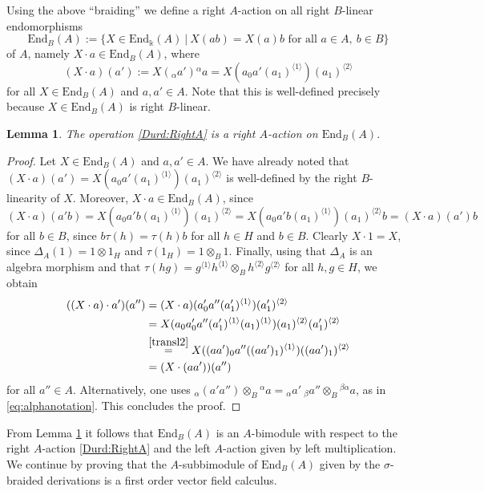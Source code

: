 \documentclass{article}
\newtheorem{lemma}[thm]{Lemma}
\theoremstyle{definition}
\begin{document}
	Using the above ``braiding'' we define a right $A$-action on all right $B$-linear endomorphisms 
	$$
	\mathrm{End}_B(A):=\{X\in\mathrm{End}_\Bbbk(A)~|~X(ab)=X(a)b\text{ for all }a\in A,~b\in B\}
	$$
	of $A$, namely $X\cdot a\in\mathrm{End}_B(A)$, where
	\begin{equation}\label{Durd:RightA}
		(X\cdot a)(a'):=X({}_\alpha a'){}^\alpha a
		=X(a_0a'(a_1)^{\langle 1\rangle})(a_1)^{\langle 2\rangle}
	\end{equation}
	for all $X\in\mathrm{End}_B(A)$ and $a,a'\in A$. Note that this is well-defined precisely because $X\in\mathrm{End}_B(A)$ is right $B$-linear.
	\begin{lemma}\label{lem:rightact}
		The operation \eqref{Durd:RightA} is a right $A$-action on $\mathrm{End}_B(A)$.
	\end{lemma}
	\begin{proof}
		Let $X\in\mathrm{End}_B(A)$ and $a,a'\in A$.
		We have already noted that $(X\cdot a)(a')=X(a_0a'(a_1)^{\langle 1\rangle})(a_1)^{\langle 2\rangle}$ is well-defined by the right $B$-linearity of $X$. Moreover, $X\cdot a\in\mathrm{End}_B(A)$, since
		$$
		(X\cdot a)(a'b)
		=X(a_0a'b(a_1)^{\langle 1\rangle})(a_1)^{\langle 2\rangle}
		=X(a_0a'b(a_1)^{\langle 1\rangle})(a_1)^{\langle 2\rangle}b
		=(X\cdot a)(a')b
		$$
		for all $b\in B$, since $b\tau(h)=\tau(h)b$ for all $h\in H$ and $b\in B$. Clearly $X\cdot 1=X$, since $\Delta_A(1)=1\otimes 1_H$ and $\tau(1_H)=1\otimes_B1$. Finally, using that $\Delta_A$ is an algebra morphism and that $\tau(hg)=g^{\langle 1\rangle}h^{\langle 1\rangle}\otimes_Bh^{\langle 2\rangle}g^{\langle 2\rangle}$ for all $h,g\in H$, we obtain
		\begin{align*}
			((X\cdot a)\cdot a')(a'')
			&=(X\cdot a)(a'_0a''(a'_1)^{\langle 1\rangle})(a'_1)^{\langle 2\rangle}\\
			&=X(a_0a'_0a''(a'_1)^{\langle 1\rangle}(a_1)^{\langle 1\rangle})(a_1)^{\langle 2\rangle}(a'_1)^{\langle 2\rangle}\\
			&\overset{\eqref{transl2}}{=}X((aa')_0a''((aa')_1)^{\langle 1\rangle})((aa')_1)^{\langle 2\rangle}\\
			&=(X\cdot(aa'))(a'')
		\end{align*}
		for all $a''\in A$. Alternatively, one uses ${}_\alpha(a'a'')\otimes_B{}^\alpha a
		={}_\alpha a'~{}_\beta a''\otimes_B{}^{\beta\alpha}a$, as in \eqref{eq:alphanotation}.
		This concludes the proof.
	\end{proof}
	From Lemma \ref{lem:rightact} it follows that $\mathrm{End}_B(A)$ is an $A$-bimodule with respect to the right $A$-action \eqref{Durd:RightA} and the left $A$-action given by left multiplication. We continue by proving that the $A$-subbimodule of $\mathrm{End}_B(A)$ given by the $\sigma$-braided derivations is a first order vector field calculus.
\end{document}
